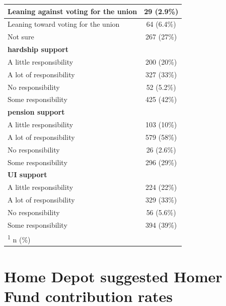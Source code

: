 \documentclass[
  11pt,
  oneside]{article}
\begin{document}
\begin{table}
\begin{tabular}[t]{l|c}
\hline
\hspace{1em}Leaning against voting for the union & 29 (2.9\%)\\
\hline
\hspace{1em}Leaning toward voting for the union & 64 (6.4\%)\\
\hline
\hspace{1em}Not sure & 267 (27\%)\\
\hline
\textbf{hardship support} & \\
\hline
\hspace{1em}A little responsibility & 200 (20\%)\\
\hline
\hspace{1em}A lot of responsibility & 327 (33\%)\\
\hline
\hspace{1em}No responsibility & 52 (5.2\%)\\
\hline
\hspace{1em}Some responsibility & 425 (42\%)\\
\hline
\textbf{pension support} & \\
\hline
\hspace{1em}A little responsibility & 103 (10\%)\\
\hline
\hspace{1em}A lot of responsibility & 579 (58\%)\\
\hline
\hspace{1em}No responsibility & 26 (2.6\%)\\
\hline
\hspace{1em}Some responsibility & 296 (29\%)\\
\hline
\textbf{UI support} & \\
\hline
\hspace{1em}A little responsibility & 224 (22\%)\\
\hline
\hspace{1em}A lot of responsibility & 329 (33\%)\\
\hline
\hspace{1em}No responsibility & 56 (5.6\%)\\
\hline
\hspace{1em}Some responsibility & 394 (39\%)\\
\hline
\multicolumn{2}{l}{\rule{0pt}{1em}\textsuperscript{1} n (\%)}\\
\end{tabular}
\end{table}

\FloatBarrier
\newpage

\section{Home Depot suggested Homer Fund contribution rates}\label{app-THD-suggcont}
\end{document}
